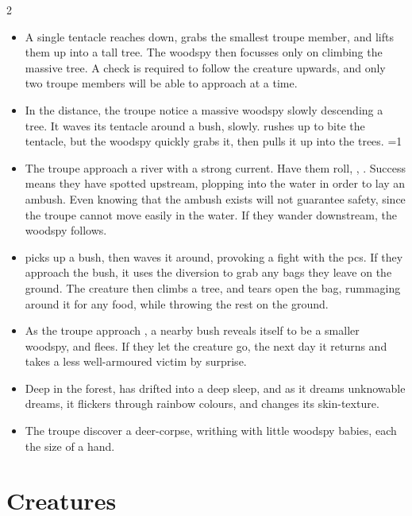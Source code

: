 \begin{multicols}{2}
\begin{itemize}
  \item
  A single tentacle reaches down, grabs the smallest troupe member, and lifts them up into a tall tree.
  The \gls{woodspy} then focusses only on climbing the massive tree.
  A  check is required to follow the creature upwards, and only two troupe members will be able to approach at a time.
  \item
  In the distance, the troupe notice a massive \gls{woodspy} slowly descending a tree.
  It waves its tentacle around a bush, slowly.
   rushes up to bite the tentacle, but the \gls{woodspy} quickly grabs it, then pulls it up into the trees.
  \ifnum\value{temperature}=1
    \item
    The troupe approach a river with a strong current.
    Have them roll, , \tn[9].
    Success means they have spotted  upstream, plopping into the water in order to lay an ambush.
    Even knowing that the ambush exists will not guarantee safety, since the troupe cannot move easily in the water.
    If they wander downstream, the \gls{woodspy} follows.
    \item
     picks up a bush, then waves it around, provoking a fight with the \glspl{pc}.
    If they approach the bush, it uses the diversion to grab any bags they leave on the ground.
    The creature then climbs a tree, and tears open the bag, rummaging around it for any food, while throwing the rest on the ground.
  \else
    \item
    As the troupe approach , a nearby bush reveals itself to be a smaller \gls{woodspy}, and flees.
    If they let the creature go, the next day it returns and takes a less well-armoured victim by surprise.
    \item
    Deep in the forest,  has drifted into a deep sleep, and as it dreams unknowable dreams, it flickers through rainbow colours, and changes its skin-texture.
    \item
    The troupe discover a deer-corpse, writhing with little \gls{woodspy} babies, each the size of a hand.
  \fi
\end{itemize}

\end{multicols}

\section[\Glsfmttext{deep} Creatures]{ Creatures \A}


